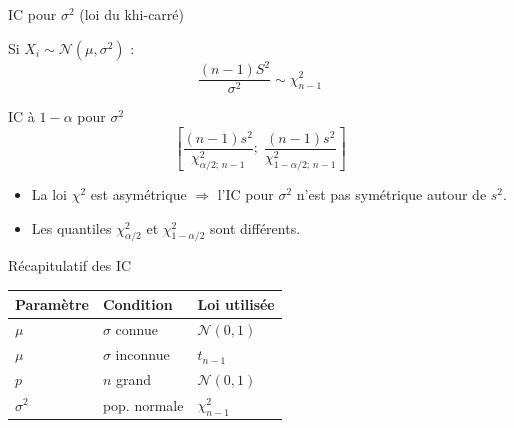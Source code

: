 \documentclass{BeamerTemplate}
\begin{document}
\begin{frame}[t]{IC pour $\sigma^2$ (loi du khi-carré)}

Si $X_i \sim \mathcal{N}(\mu, \sigma^2)$ :
$$\frac{(n-1)S^2}{\sigma^2} \sim \chi^2_{n-1}$$

\begin{Boite}{IC à $1-\alpha$ pour $\sigma^2$}
$$\left[\frac{(n-1)s^2}{\chi^2_{\alpha/2;\,n-1}};\; \frac{(n-1)s^2}{\chi^2_{1-\alpha/2;\,n-1}}\right]$$
\end{Boite}

\medskip
\begin{itemize}\itemsep3mm
  \item La loi $\chi^2$ est \alert{asymétrique} $\Rightarrow$ l'IC pour $\sigma^2$ n'est pas symétrique autour de $s^2$.
  \item Les quantiles $\chi^2_{\alpha/2}$ et $\chi^2_{1-\alpha/2}$ sont différents.
\end{itemize}

\end{frame}

\begin{frame}[t]{Récapitulatif des IC}

\begin{center}
\small
\begin{tabular}{lll}\hline
\textbf{Paramètre} & \textbf{Condition} & \textbf{Loi utilisée} \\ \hline
$\mu$ & $\sigma$ connue & $\mathcal{N}(0,1)$ \\[3pt]
$\mu$ & $\sigma$ inconnue & $t_{n-1}$ \\[3pt]
$p$ & $n$ grand & $\mathcal{N}(0,1)$ \\[3pt]
$\sigma^2$ & pop. normale & $\chi^2_{n-1}$ \\ \hline
\end{tabular}
\end{center}

\end{frame}
\end{document}
